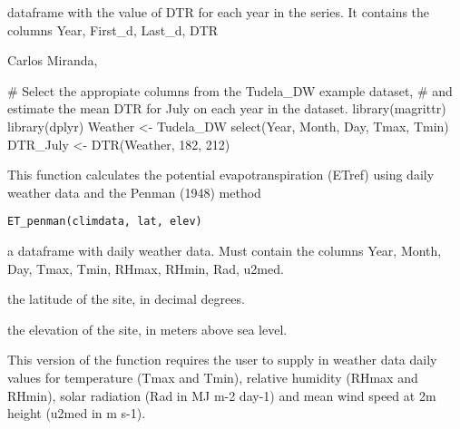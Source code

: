 \documentclass[a4paper]{book}
\begin{document}
%
\begin{Value}
dataframe with the value of DTR for each year in the series. 
It contains the columns Year, First\_d, Last\_d, DTR
\end{Value}
%
\begin{Author}\relax
Carlos Miranda, 
\end{Author}
%
\begin{Examples}
\begin{ExampleCode}

# Select the appropiate columns from the Tudela_DW example dataset,
# and estimate the mean DTR for July on each year in the dataset.
library(magrittr)
library(dplyr)
Weather <- Tudela_DW %
   select(Year, Month, Day, Tmax, Tmin)
DTR_July <- DTR(Weather, 182, 212)

\end{ExampleCode}
\end{Examples}
%
\begin{Description}\relax
This function calculates the potential evapotranspiration (ETref) using daily 
weather data and the Penman (1948) method
\end{Description}
%
\begin{Usage}
\begin{verbatim}
ET_penman(climdata, lat, elev)
\end{verbatim}
\end{Usage}
%
\begin{Arguments}
\begin{ldescription}
\item[\code{climdata}] a dataframe with daily weather data.
Must contain the columns Year, Month, Day, Tmax, Tmin, RHmax, RHmin, Rad, u2med.

\item[\code{lat}] the latitude of the site, in decimal degrees.

\item[\code{elev}] the elevation of the site, in meters above sea level.
\end{ldescription}
\end{Arguments}
%
\begin{Details}\relax
This version of the function requires the user to supply in weather data daily
values for temperature (Tmax and Tmin), relative humidity (RHmax and RHmin), 
solar radiation (Rad in MJ m-2 day-1) and mean wind speed at 2m height 
(u2med in m s-1).
\end{Details}
\end{document}
